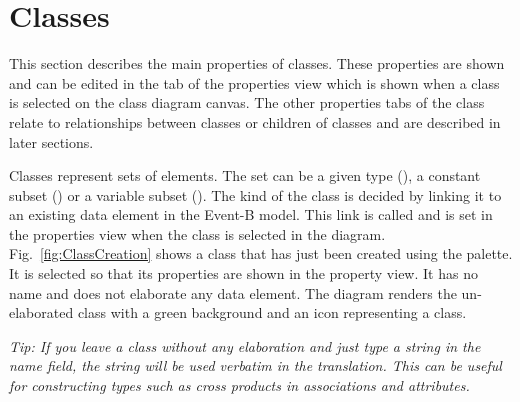 \section{Classes}
\label{sec:classdiagrams-classes}

This section describes the main properties of classes. 
These properties are shown and can be edited in the  tab of the properties view which is shown when a class is selected on the class diagram canvas.
The other properties tabs of the class relate to relationships between classes or children of classes and are described in later sections.

Classes represent sets of elements. 
The set can be a given type (), a constant subset () or a variable subset ().
The kind of the class is decided by linking it to an existing data element in the Event-B model.
This link is called  and is set in the properties view when the class is selected in the diagram.
Fig.~\ref{fig:ClassCreation} shows a class that has just been created using the palette. 
It is selected so that its properties are shown in the property view.
It has no name and does not elaborate any data element.
The diagram renders the un-elaborated class with a green background and an icon representing a class.

\emph{Tip: If you leave a class without any elaboration and just type a string in the name field, the string will be used verbatim in the translation. 
	This can be useful for constructing types such as cross products in associations and attributes.}

